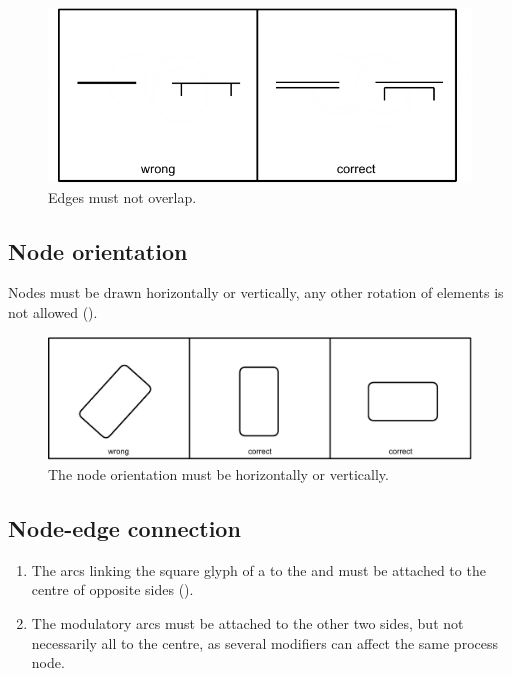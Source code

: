 \begin{figure}[htb]
  \centering
  \includegraphics[scale=0.8]{images/build/layout_edge_edge.pdf}
  \caption{Edges must not overlap.}\label{fig:layout4}
\end{figure}

\subsection{Node orientation}

Nodes must be drawn horizontally or vertically, any other
rotation of elements is not allowed ().

\begin{figure}[htb]
  \centering
  \includegraphics[scale=0.8]{images/build/layout_orientation.pdf}
  \caption{The node orientation must be horizontally or
  vertically.}\label{fig:layout5}
\end{figure}

\subsection{Node-edge connection}

\begin{enumerate}
\item The arcs linking the square glyph of a  to the  and 
 must be attached to the centre of opposite sides ().
\item The modulatory arcs must be attached to the other two sides, but not necessarily all to the centre, as several modifiers can affect the same process node.
\end{enumerate}

